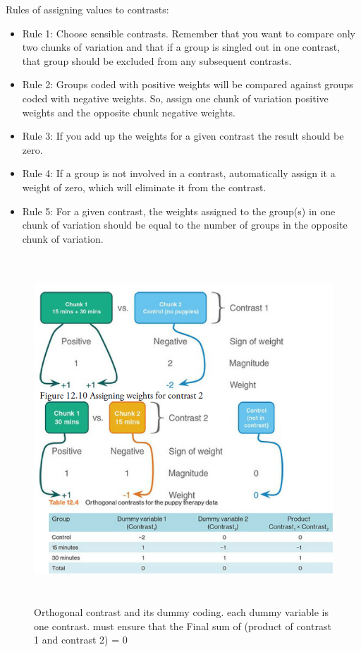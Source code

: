 Rules of assigning values to contrasts:
\begin{itemize}
\item Rule 1: Choose sensible contrasts. Remember that you want to compare only two
chunks of variation and that if a group is singled out in one contrast, that group
should be excluded from any subsequent contrasts.

\item Rule 2: Groups coded with positive weights will be compared against groups coded
with negative weights. So, assign one chunk of variation positive weights and the
opposite chunk negative weights.
\item Rule 3: If you add up the weights for a given contrast the result should be zero.
\item Rule 4: If a group is not involved in a contrast, automatically assign it a weight of
zero, which will eliminate it from the contrast.
\item Rule 5: For a given contrast, the weights assigned to the group(s) in one chunk of
variation should be equal to the number of groups in the opposite chunk of variation.
\end{itemize}
\begin{figure}[h]
	\includegraphics[width=1\textwidth,height=130mm]{Chapter 12 GLM 1 Comparing Several Independent Means ANOVA/orthogonalcontrast.PNG}
	\caption{Orthogonal contrast and its dummy coding. each dummy variable is one contrast. must ensure that the Final sum of (product of contrast 1 and contrast 2) = 0}
\end{figure}


